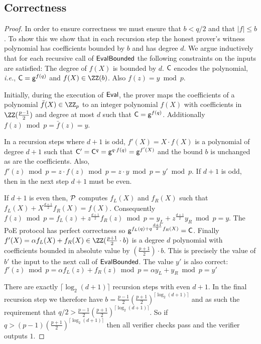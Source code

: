 \subsection{Correctness}
\label{appendix:correctness}

\def\thelemma{\ref{lem:correctness}}
\begin{lemma}
	\correctnesslemma
\end{lemma}

\begin{proof}
In order to ensure correctness we must ensure that $b< q/2$ and that $|f|\leq b$. To show this we show that in each recursion step the honest prover's witness polynomial has coefficients bounded by $b$ and has degree $d$. 
We argue inductively that for each recursive call of $\textsf{{EvalBounded}}$ the following constraints on the inputs are satisfied: The degree of $f(X)$ is bounded by $d$. $\mathsf{C}$ encodes the polynomial, \emph{i.e.}, $\mathsf{C}=\mathsf{g}^{f(q)}$ and $f(X)\in \ZZ(b)$. Also $f(z) = y\bmod p$.

Initially, during the execution of $\textsf{{Eval}}$, the prover maps the coefficients of a polynomial $\bar{f}(X)\in \ZZ_p$ to an integer polynomial $f(X)$ with coefficients in $\ZZ(\frac{p-1}{2})$ and degree at most $d$ such that $\mathsf{C}=\mathsf{g}^{f(q)}$. Additionally $f(z)\bmod p=\bar{f}(z)=y$.

 In a recursion steps where $d+1$ is odd, $f'(X)=X\cdot f(X)$ is a polynomial of degree $d+1$ such that $\mathsf{C}'=\mathsf{C}^q=\mathsf{g}^{q\cdot f(q)}=\mathsf{g}^{f'(X)}$ and the bound $b$ is unchanged as are the coefficients. Also, $f'(z)\bmod p = z \cdot f(z) \bmod p=z\cdot y\bmod p = y' \bmod p$. If $d+1$ is odd, then in the next step $d+1$ must be even.
 
 If $d+1$ is even then, $\mathcal{P}$ computes $f_L(X)$ and $f_R(X)$ such that $f_L(X)+X^{\frac{d+1}{2}} f_R(X)=f(X)$. Consequently $f(z) \bmod p=f_L(z)+ z^{\frac{d+1}{2}} f_R(z)\bmod p=y_L+z^{\frac{d+1}{2}}  y_R\bmod p =y$. The \textsf{PoE} protocol has perfect correctness so {$\mathsf{g}^{f_L(q)+q^{\frac{d+1}{2}} f_R(X)}=\mathsf{C}$}.
 Finally $f'(X)=\alpha f_L(X) + f_R(X)\in \ZZ(\frac{p+1}{2}\cdot b)$ is a degree $d$ polynomial with coefficients bounded in absolute value by $(\frac{p+1}{2})\cdot b$. This is precisely the value of $b'$ the input to the next call of $\textsf{{EvalBounded}}$. The value $y'$ is also correct:
$f'(z)\bmod p=\alpha f_L(z) +f_R(z) \bmod p= \alpha y_L +y_R\bmod p=y'$
 
 There are exactly $\lceil\log_2(d+1)\rceil$ recursion steps with even $d+1$. In the final recursion step we therefore have $b=\frac{p-1}{2}(\frac{p+1}{2})^{\lceil\log_2(d+1)\rceil}$ and as such the requirement that $q/2>\frac{p-1}{2}(\frac{p+1}{2})^{\lceil\log_2(d+1)\rceil}$. 
 So if $q>(p-1) (\frac{p+1}{2})^{\lceil \log_2(d+1)\rceil}$ then all verifier checks pass and the verifier outputs $1$.
\end{proof} 


